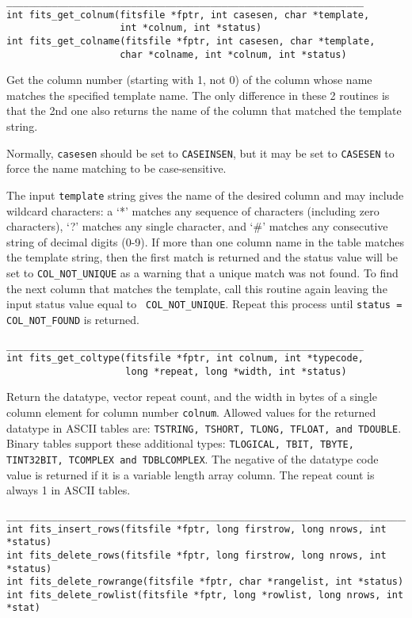 \documentclass[11pt]{article}
\begin{document}
\begin{verbatim}
_______________________________________________________________
int fits_get_colnum(fitsfile *fptr, int casesen, char *template,
                    int *colnum, int *status)
int fits_get_colname(fitsfile *fptr, int casesen, char *template,
                    char *colname, int *colnum, int *status)
\end{verbatim}

Get the  column number (starting with 1, not 0) of the column whose
name matches the specified template name.  The only difference in
these 2 routines is that the 2nd one also returns the name of the
column that matched the template string.

Normally, {\tt casesen} should
be set to {\tt CASEINSEN}, but it may be set to {\tt CASESEN} to force
the name matching to be case-sensitive.

The input {\tt template} string gives the name of the desired column and
may include wildcard characters:  a `*' matches any sequence of
characters (including zero characters), `?' matches any single
character, and `\#' matches any consecutive string of decimal digits
(0-9).  If more than one column name in the table matches the template
string, then the first match is returned and the status value will be
set to {\tt COL\_NOT\_UNIQUE}  as a warning that a unique match was not
found.  To find the next column that matches the template, call this
routine again leaving the input status value equal to {\tt
COL\_NOT\_UNIQUE}.  Repeat this process until {\tt status =
COL\_NOT\_FOUND}  is returned.

\begin{verbatim}
_______________________________________________________________
int fits_get_coltype(fitsfile *fptr, int colnum, int *typecode,
                     long *repeat, long *width, int *status)
\end{verbatim}

Return the datatype, vector repeat count, and the width in bytes of a
single column element for column number {\tt colnum}.  Allowed values
for the returned datatype in ASCII tables are:  {\tt TSTRING, TSHORT,
TLONG, TFLOAT, and TDOUBLE}.  Binary tables support these additional
types: {\tt TLOGICAL, TBIT, TBYTE, TINT32BIT, TCOMPLEX and TDBLCOMPLEX}.  The
negative of the datatype code value is returned if it is a variable
length array column.  The repeat count is always 1 in ASCII tables.

\begin{verbatim}
____________________________________________________________________________
int fits_insert_rows(fitsfile *fptr, long firstrow, long nrows, int *status)
int fits_delete_rows(fitsfile *fptr, long firstrow, long nrows, int *status)
int fits_delete_rowrange(fitsfile *fptr, char *rangelist, int *status)
int fits_delete_rowlist(fitsfile *fptr, long *rowlist, long nrows, int *stat)
\end{verbatim}
\end{document}
